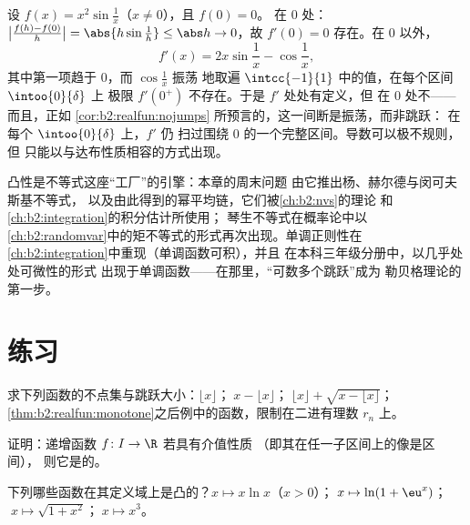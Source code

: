 \begin{example}[典型的振荡导数]\label{ex:b2:realfun:oscillation}
设 $f(x) = x^2\sin\frac1x$（$x \neq 0$），且 $f(0) = 0$。
在 $0$ 处：$\bigl|\frac{f(h) - f(0)}{h}\bigr| = \abs{h\sin\frac1h}
\leq \abs h \to 0$，故 $f'(0) = 0$ 存在。在 $0$ 以外，
\[
f'(x) = 2x\sin\frac1x - \cos\frac1x ,
\]
其中第一项趋于 $0$，而 $\cos\frac1x$ 振荡
地取遍 $\intcc{-1}{1}$ 中的值，在每个区间 $\intoo{0}{\delta}$ 上
极限 $f'(0^+)$ 不存在。于是 $f'$ 处处有定义，但
在 $0$ 处不——而且，正如
\cref{cor:b2:realfun:nojumps} 所预言的，这一间断是振荡，而非跳跃：
在每个 $\intoo{0}{\delta}$ 上，$f'$ 仍
扫过围绕 $0$ 的一个完整区间。导数可以极不规则，但
只能以与达布性质相容的方式出现。
\end{example}

\begin{remark}[本章的应用]
凸性是不等式这座“工厂”的引擎：本章的周末问题
由它推出杨、赫尔德与闵可夫斯基不等式，
以及由此得到的幂平均链，它们被\cref{ch:b2:nvs}的理论
和\cref{ch:b2:integration}的积分估计所使用；
琴生不等式在概率论中以
\cref{ch:b2:randomvar}中的矩不等式的形式再次出现。单调正则性在
\cref{ch:b2:integration}中重现（单调函数可积），并且
在本科三年级分册中，以几乎处处可微性的形式
出现于单调函数——在那里，“可数多个跳跃”成为
勒贝格理论的第一步。
\end{remark}

\section{练习}

\begin{exercise}[$\star$]\label{exo:b2:realfun:1}
求下列函数的不点集与跳跃大小：$\lfloor x
\rfloor$；$\;x - \lfloor x\rfloor$；$\;\lfloor x \rfloor + \sqrt{x
- \lfloor x\rfloor}$；
\cref{thm:b2:realfun:monotone}之后例中的函数，限制在二进有理数
$r_n$ 上。
\end{exercise}

\begin{exercise}[$\star$]\label{exo:b2:realfun:2}
证明：递增函数 $f \colon I \to \R$ 若具有介值性质
（即其在任一子区间上的像是区间），
则它是的。
\end{exercise}

\begin{exercise}[$\star$]\label{exo:b2:realfun:3}
下列哪些函数在其定义域上是凸的？$x \mapsto
x\ln x$（$x > 0$）；$\;x \mapsto \ln(1 + \eu^x)$；$\;x \mapsto
\sqrt{1 + x^2}$；$\;x \mapsto x^3$。
\end{exercise}

